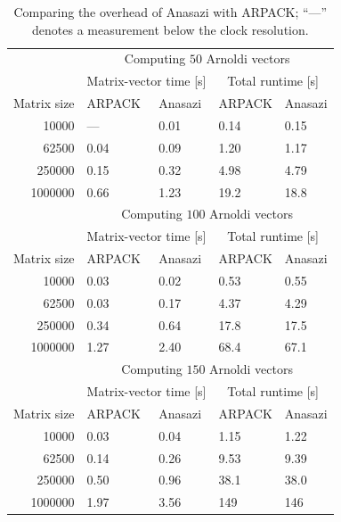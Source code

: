\documentclass[acmtoms]{acmtrans2m}
\begin{document}
\begin{table}
\caption{Comparing the overhead of Anasazi with ARPACK; ``---'' denotes a measurement
below the clock resolution.}
\label{table:timings}
\begin{center}
\begin{tabular}{r|ll|ll|}
       \cline{2-5} %
        & \multicolumn{4}{c|}{Computing $50$ Arnoldi vectors} \\ \cline{2-5}
        & \multicolumn{2}{c|}{Matrix-vector time [s]} &
       \multicolumn{2}{c|}{Total runtime [s]}\\ \hline
       Matrix size & ARPACK & Anasazi & ARPACK & Anasazi \\ \hline %
       10000 & --- & 0.01 & 0.14 & 0.15 \\
       62500 & 0.04 & 0.09 & 1.20 & 1.17 \\
       250000 & 0.15 & 0.32 & 4.98 & 4.79 \\
       1000000 & 0.66 & 1.23 & 19.2 & 18.8 \\
       \hline
        & \multicolumn{4}{c|}{Computing $100$ Arnoldi vectors} \\ \cline{2-5}
        & \multicolumn{2}{c|}{Matrix-vector time [s]} &
       \multicolumn{2}{c|}{Total runtime [s]}\\ \hline
       Matrix size & ARPACK & Anasazi & ARPACK & Anasazi \\ \hline %
       10000 & 0.03 & 0.02 & 0.53 & 0.55 \\
       62500 & 0.03 & 0.17 & 4.37 & 4.29 \\
       250000 & 0.34 & 0.64 & 17.8 & 17.5 \\
       1000000 & 1.27 & 2.40 & 68.4 & 67.1 \\
       \hline
        & \multicolumn{4}{c|}{Computing $150$ Arnoldi vectors} \\ \cline{2-5}
        & \multicolumn{2}{c|}{Matrix-vector time [s]} &
       \multicolumn{2}{c|}{Total runtime [s]}\\ \hline
       Matrix size & ARPACK & Anasazi & ARPACK & Anasazi \\ \hline %
       10000 & 0.03 & 0.04 & 1.15 & 1.22 \\
       62500 & 0.14 & 0.26 & 9.53 & 9.39 \\
       250000 & 0.50 & 0.96 & 38.1 & 38.0 \\
       1000000 & 1.97 & 3.56 & 149 & 146 \\
       \hline
     \end{tabular}
\end{center}
\end{table}
\end{document}
